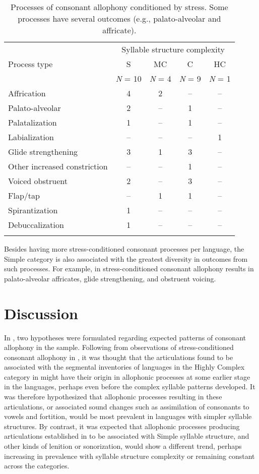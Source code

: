 \begin{table}
\begin{tabular}{lcccc}
\lsptoprule
 & \multicolumn{4}{c}{Syllable structure complexity}\\\cmidrule(lr){2-5}
 Process type & S & MC & C & HC\\
             & \textit{N} = 10 & \textit{N} = 4 & \textit{N} = 9 & \textit{N} = 1\\\midrule
 Affrication & 4 & 2 & -- & --\\
 Palato-alveolar & 2 & -- & 1 & --\\
 Palatalization & 1 & -- & 1 & --\\
 Labialization & -- & -- & -- & 1\\
 Glide strengthening & 3 & 1 & 3 & --\\
 Other increased constriction & -- & -- & 1 & --\\
 Voiced obstruent & 2 & -- & 3 & --\\
 Flap/tap & -- & 1 & 1 & --\\
 Spirantization & 1 & -- & -- & --\\
 Debuccalization & 1 & -- & -- & --\\
\lspbottomrule
\end{tabular}
\caption{\label{tab:7.9}Processes of consonant allophony conditioned by stress. Some processes have several outcomes (e.g., palato-alveolar and affricate).}
\end{table}

  Besides having more stress-conditioned consonant processes per language, the Simple category is also associated with the greatest diversity in outcomes from such processes. For example, in  stress-conditioned consonant allophony results in palato-alveolar affricates, glide strengthening, and obstruent voicing.

\section{Discussion}\label{sec:7.4}

  In , two hypotheses were formulated regarding expected patterns of consonant allophony in the sample. Following from observations of stress-conditioned consonant allophony in , it was thought that the articulations found to be associated with the segmental inventories of languages in the Highly Complex category in  might have their origin in allophonic processes at some earlier stage in the languages, perhaps even before the complex syllable patterns developed. It was therefore hypothesized that allophonic processes resulting in these articulations, or associated sound changes such as assimilation of consonants to vowels and fortition, would be most prevalent in languages with simpler syllable structures. By contrast, it was expected that allophonic processes producing articulations established in  to be associated with Simple syllable structure, and other kinds of lenition or sonorization, would show a different trend, perhaps increasing in prevalence with syllable structure complexity or remaining constant across the categories.


